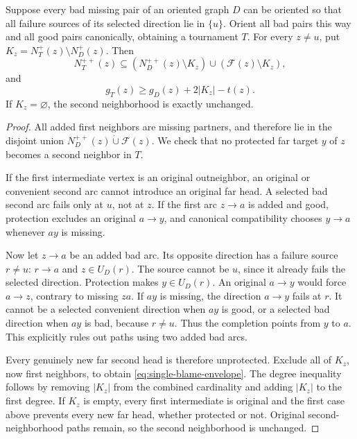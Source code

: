 \begin{lemma}\label{lem:single-blame-unprotected-transfer}
Suppose every bad missing pair of an oriented graph $D$ can be oriented
so that all failure sources of its selected direction lie in $\{u\}$.
Orient all bad pairs this way and all good pairs canonically, obtaining
a tournament $T$.
For every $z\ne u$, put
$K_z=N_T^+(z)\setminus N_D^+(z)$.
Then
\[
 {
 N_T^{++}(z)\subseteq
 (N_D^{++}(z)\setminus K_z)
 \cup(\mathcal F(z)\setminus K_z),}
 \tag{TU1}\label{eq:single-blame-envelope}
\]
and
\[
 g_T(z)\ge g_D(z)+2|K_z|-t(z).
\]
If $K_z=\varnothing$, the second neighborhood is exactly unchanged.
\end{lemma}
\begin{proof}
All added first neighbors are missing partners, and therefore lie in
the disjoint union $N_D^{++}(z)\dot\cup\mathcal F(z)$.
We check that no protected far target $y$ of $z$ becomes a second
neighbor in $T$.

If the first intermediate vertex is an original outneighbor, an
original or convenient second arc cannot introduce an original far
head.  A selected bad second arc fails only at $u$, not at $z$.
If the first arc $z\to a$ is added and good, protection excludes an
original $a\to y$, and canonical compatibility chooses $y\to a$
whenever $ay$ is missing.

Now let $z\to a$ be an added bad arc.
Its opposite direction has a failure source $r\ne u$:
$r\to a$ and $z\in U_D(r)$.
The source cannot be $u$, since it already fails the selected direction.
Protection makes $y\in U_D(r)$.
An original $a\to y$ would force $a\to z$, contrary to missing $za$.
If $ay$ is missing, the direction $a\to y$ fails at $r$.
It cannot be a selected convenient direction when $ay$ is good,
or a selected bad direction when $ay$ is bad, because $r\ne u$.
Thus the completion points from $y$ to $a$.
This explicitly rules out paths using two added bad arcs.

Every genuinely new far second head is therefore unprotected.
Exclude all of $K_z$, now first neighbors, to obtain
\eqref{eq:single-blame-envelope}.
The degree inequality follows by removing $|K_z|$ from the combined
cardinality and adding $|K_z|$ to the first degree.
If $K_z$ is empty, every first intermediate is original and the first
case above prevents every new far head, whether protected or not.
Original second-neighborhood paths remain, so the second neighborhood
is unchanged.
\end{proof}

